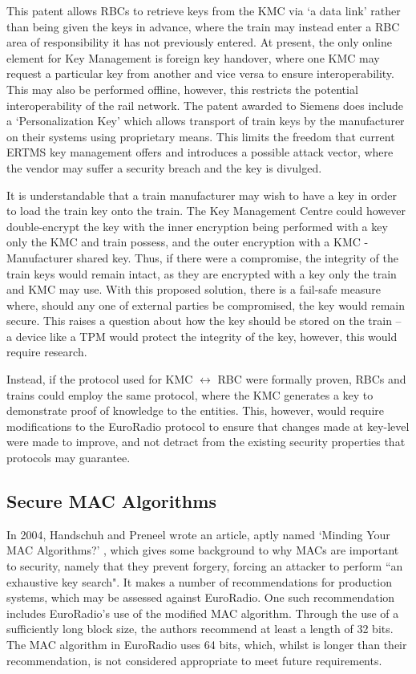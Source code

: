\documentclass[twoside,11pt,a4paper]{article}
\begin{document}
This patent allows RBCs to retrieve keys from the KMC via `a data link' rather than being given the keys in advance, where the train may instead enter a RBC area of responsibility it has not previously entered. At present, the only online element for Key Management is foreign key handover, where one KMC may request a particular key from another and vice versa to ensure interoperability. This may also be performed offline, however, this restricts the potential interoperability of the rail network. The patent awarded to Siemens does include a `Personalization Key' which allows transport of train keys by the manufacturer on their systems using proprietary means. This limits the freedom that current ERTMS key management offers and introduces a possible attack vector, where the vendor may suffer a security breach and the key is divulged.

It is understandable that a train manufacturer may wish to have a key in order to load the train key onto the train. The Key Management Centre could however double-encrypt the key with the inner encryption being performed with a key only the KMC and train possess, and the outer encryption with a KMC - Manufacturer shared key. Thus, if there were a compromise, the integrity of the train keys would remain intact, as they are encrypted with a key only the train and KMC may use. With this proposed solution, there is a fail-safe measure where, should any one of external parties be compromised, the key would remain secure. This raises a question about how the key should be stored on the train -- a device like a TPM would protect the integrity of the key, however, this would require research.

Instead, if the protocol used for KMC $\leftrightarrow$ RBC were formally proven, RBCs and trains could employ the same protocol, where the KMC generates a key to demonstrate proof of knowledge to the entities. This, however, would require modifications to the EuroRadio protocol to ensure that changes made at key-level were made to improve, and not detract from the existing security properties that protocols may guarantee.
\clearpage
\subsection{Secure MAC Algorithms}
In 2004, Handschuh and Preneel wrote an article, aptly named `Minding Your MAC Algorithms?' \citep{MACAlgos04a}, which gives some background to why MACs are important to security, namely that they prevent forgery, forcing an attacker to perform ``an exhaustive key search". It makes a number of recommendations for production systems, which may be assessed against EuroRadio. One such recommendation includes EuroRadio's use of the modified MAC algorithm. Through the use of a sufficiently long block size, the authors recommend at least a length of 32 bits. The MAC algorithm in EuroRadio uses 64 bits, which, whilst is longer than their recommendation, is not considered appropriate to meet future requirements.
\end{document}
